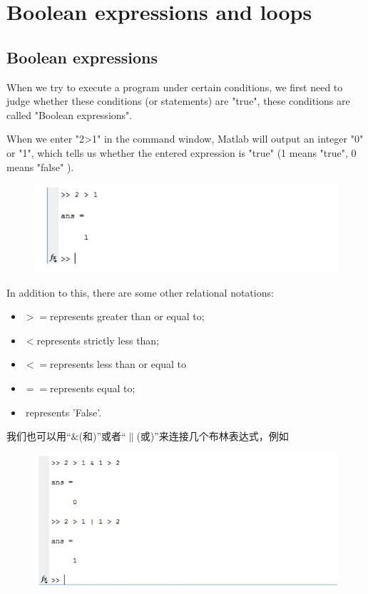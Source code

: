 \documentclass[10pt,math=newtx,citestyle=gb7714-2015,bibstyle=gb7714-2015]{elegantbook}
\begin{document}
{{{	\section{Boolean expressions and loops}
	\subsection{Boolean expressions}
	When we try to execute a program under certain conditions, we first need to judge whether these conditions (or statements) are "true", these conditions are called "Boolean expressions".
	
	When we enter "2>1" in the command window, Matlab will output an integer "0" or "1", which tells us whether the entered expression is "true" (1 means "true", 0 means "false" ).
	\begin{figure}[htbp!]
		\centering
		\includegraphics[width=0.8\linewidth]{FIG/Boolean}
		\centering
	\end{figure}
	
	In addition to this, there are some other relational notations:
	
	\begin{itemize}
		\item $>=$represents greater than or equal to;
		\item $<$represents strictly less than;
		\item $<=$represents less than or equal to
		\item $==$represents equal to;
		\item $~$represents 'False'.
	\end{itemize}
	
	我们也可以用“$\&$(和)”或者“$\|$(或)”来连接几个布林表达式，例如
	\begin{figure}[htbp!]
		\centering
		\includegraphics[width=0.8\linewidth]{FIG/connecting}
		\centering
	\end{figure}
	
}}}
\end{document}
